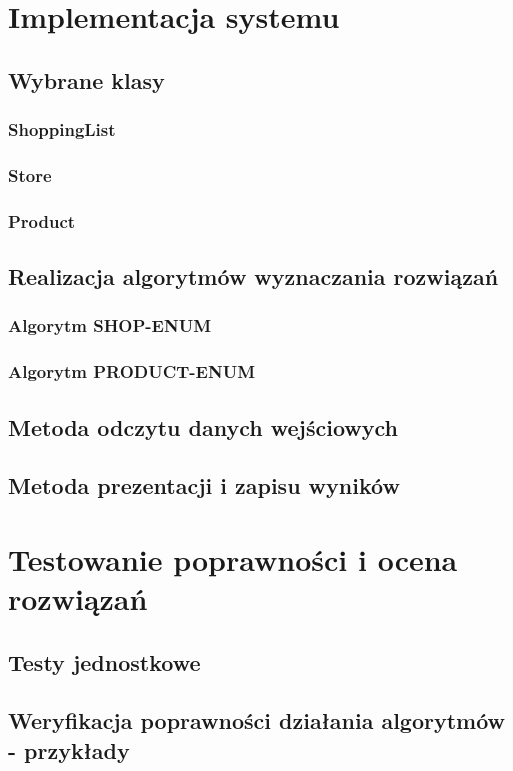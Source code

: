 \documentclass[a4paper]{article}
\let\oldsection\section
\renewcommand\section{\clearpage\oldsection}
\begin{document}
\section{Implementacja systemu}
\subsection{Wybrane klasy}
\subsubsection{ShoppingList}
\subsubsection{Store}
\subsubsection{Product}
\subsection{Realizacja algorytmów wyznaczania rozwiązań}
\subsubsection{Algorytm SHOP-ENUM}
\subsubsection{Algorytm PRODUCT-ENUM}
\subsection{Metoda odczytu danych wejściowych}
\subsection{Metoda prezentacji i zapisu wyników}

\section{Testowanie poprawności i ocena rozwiązań}
\subsection{Testy jednostkowe}
\subsection{Weryfikacja poprawności działania algorytmów - przykłady}
\end{document}
